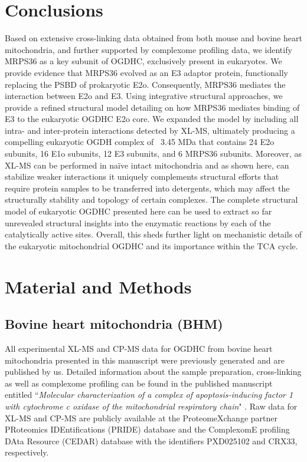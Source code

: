 \section{Conclusions}
Based on extensive cross-linking data obtained from both mouse and bovine heart mitochondria, and further supported by complexome profiling data, we identify MRPS36 as a key subunit of OGDHC, exclusively present in eukaryotes. We provide evidence that MRPS36 evolved as an E3 adaptor protein, functionally replacing the PSBD of prokaryotic E2o. Consequently, MRPS36 mediates the interaction between E2o and E3. Using integrative structural approaches, we provide a refined structural model detailing on how MRPS36 mediates binding of E3 to the eukaryotic OGDHC E2o core. We expanded the model by including all intra- and inter-protein interactions detected by XL-MS, ultimately producing a compelling eukaryotic OGDH complex of ~3.45 MDa that contains 24 E2o subunits, 16 E1o subunits, 12 E3 subunits, and 6 MRPS36 subunits. Moreover, as XL-MS can be performed in naïve intact mitochondria and as shown here, can stabilize weaker interactions it uniquely complements structural efforts that require protein samples to be transferred into detergents, which may affect the structurally stability and topology of certain complexes. The complete structural model of eukaryotic OGDHC presented here can be used to extract so far unrevealed structural insights into the enzymatic reactions by each of the catalytically active sites. Overall, this sheds further light on mechanistic details of the eukaryotic mitochondrial OGDHC and its importance within the TCA cycle.
%
\section{Material and Methods}
\subsection*{Bovine heart mitochondria (BHM)}
All experimental XL-MS and CP-MS data for OGDHC from bovine heart mitochondria presented in this manuscript were previously generated and are published by us. Detailed information about the sample preparation, cross-linking as well as complexome profiling can be found in the published manuscript entitled “\emph{Molecular characterization of a complex of apoptosis-inducing factor 1 with cytochrome c oxidase of the mitochondrial respiratory chain}" \cite{Hevler_2021b}. Raw data for XL-MS and CP-MS are publicly available at the ProteomeXchange partner PRoteomics IDEntifications (PRIDE) database and the ComplexomE profiling DAta Resource (CEDAR) database with the identifiers PXD025102 and CRX33, respectively.
%
